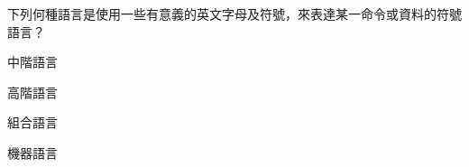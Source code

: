 \ifx\ntpcNinetyTwo\undefined[92學年基北區] \fi
下列何種語言是使用一些有意義的英文字母及符號，來表達某一命令或資料的符號語言？
  \begin{optionlist}
  \item 中階語言
  \item 高階語言
  \item 組合語言\label{ntpc-92-a13}
  \item 機器語言
  \end{optionlist}